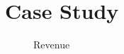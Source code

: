 \section{Case Study}




\begin{figure}[h!]
	\centering
	
	\begin{minipage}{0.95\textwidth}
		\hfill
		
		\caption{Revenue }\label{fig:overyear}
	\end{minipage}	
\end{figure}


